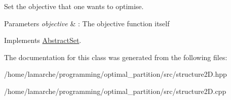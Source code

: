 Set the objective that one wants to optimise. 


\begin{DoxyParams}{Parameters}
{\em objective} & \-: The objective function itself \\
\hline
\end{DoxyParams}


Implements \hyperlink{classAbstractSet_a7aef71679a18ab7965d1098da15b26c2}{Abstract\-Set}.



The documentation for this class was generated from the following files\-:\begin{DoxyCompactItemize}
\item 
/home/lamarche/programming/optimal\-\_\-partition/src/structure2\-D.\-hpp\item 
/home/lamarche/programming/optimal\-\_\-partition/src/structure2\-D.\-cpp\end{DoxyCompactItemize}
